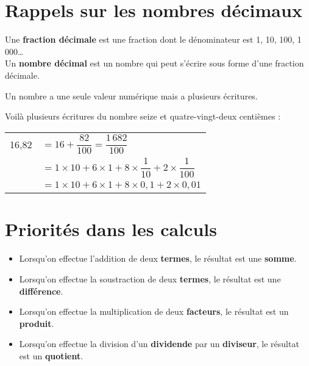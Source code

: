 \documentclass[nocrop]{sesamanuel_college_5e_new}
\begin{document}
\cours 

\section{Rappels sur les nombres décimaux}

\begin{definition}
   Une {\bf fraction décimale} est une fraction dont le dénominateur est  1, 10, 100, 1\,000\dots \\
   Un {\bf nombre décimal} est un nombre qui peut s'écrire sous forme d'une fraction décimale.
\end{definition}

\medskip

Un nombre a une seule valeur numérique mais a plusieurs écritures.
   
\begin{exemple*1}
   Voilà plusieurs écritures du nombre seize et quatre-vingt-deux centièmes : \par\smallskip
    {
    \begin{tabular}{cp{13cm}}
      16,82 & $=16+\dfrac{82}{100} =\dfrac{1\,682}{100}$ \\
      & $=1\times10+6\times1+8\times\dfrac{1}{10}+2\times\dfrac{1}{100}$ \\
      & $=1\times10+6\times1+8\times0,1+2\times0,01$ \\ [-5mm]
   \end{tabular}}
\end{exemple*1}


\section{Priorités dans les calculs}

\begin{definition}
   \begin{itemize}
      \item Lorsqu'on effectue l'addition de deux {\bf termes}, le résultat est une {\bf somme}.
      \item Lorsqu'on effectue la soustraction de deux {\bf termes}, le résultat est une {\bf différence}.
      \item Lorsqu'on effectue la multiplication de deux {\bf facteurs}, le résultat est un {\bf produit}.
      \item Lorsqu'on effectue la division d'un {\bf dividende} par un {\bf diviseur}, le résultat est un {\bf quotient}. \\ [-10mm]
   \end{itemize}
\end{definition}
\end{document}
